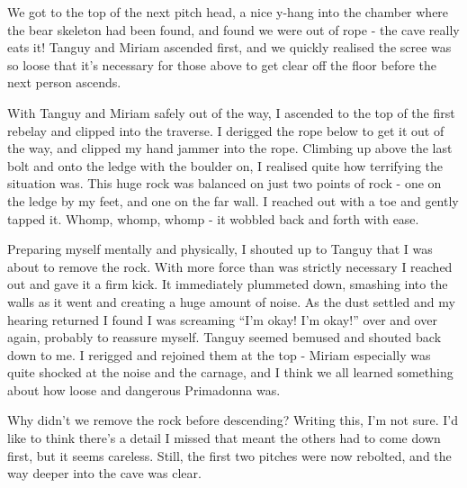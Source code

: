 We got to the top of the next pitch head, a nice y-hang into the chamber where the bear skeleton had been found, and found we were out of rope - the cave really eats it! Tanguy and Miriam ascended first, and we quickly realised the scree was so loose that it’s necessary for those above to get clear off the floor before the next person ascends.



With Tanguy and Miriam safely out of the way, I ascended to the top of the first rebelay and clipped into the traverse. I derigged the rope below to get it out of the way, and clipped my hand jammer into the rope. Climbing up above the last bolt and onto the ledge with the boulder on, I realised quite how terrifying the situation was. This huge rock was balanced on just two points of rock - one on the ledge by my feet, and one on the far wall. I reached out with a toe and gently tapped it. Whomp, whomp, whomp - it wobbled back and forth with ease. 

Preparing myself mentally and physically, I shouted up to Tanguy that I was about to remove the rock. With more force than was strictly necessary I reached out and gave it a firm kick. It immediately plummeted down, smashing into the walls as it went and creating a huge amount of noise. As the dust settled and my hearing returned I found I was screaming “I’m okay! I’m okay!” over and over again, probably to reassure myself. Tanguy seemed bemused and shouted back down to me. I rerigged and rejoined them at the top - Miriam especially was quite shocked at the noise and the carnage, and I think we all learned something about how loose and dangerous Primadonna was.

Why didn’t we remove the rock before descending? Writing this, I’m not sure. I’d like to think there’s a detail I missed that meant the others had to come down first, but it seems careless. Still, the first two pitches were now rebolted, and the way deeper into the cave was clear.

